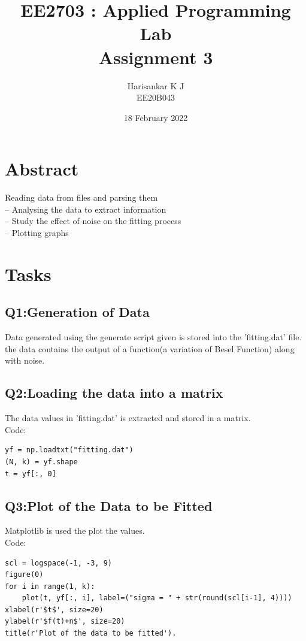 \documentclass[12pt, a4paper]{report}
\title{\textbf{EE2703 : Applied Programming Lab}\\Assignment 3} %
\author{Harisankar K J \\ EE20B043} %
\date{18 February 2022} %
\begin{document}
		
		
\maketitle %
\section*{Abstract}
Reading data from files and parsing them\\
– Analysing the data to extract information\\
– Study the effect of noise on the fitting process\\
– Plotting graphs\\
\section*{Tasks}
\subsection{Q1:Generation of Data}
Data generated using the generate script given is stored into the 'fitting.dat' file. the data contains the output of a function(a variation of Besel Function) along with noise.
\subsection{Q2:Loading the data into a matrix}
The data values in 'fitting.dat' is extracted and stored in a matrix.\\Code:
\begin{verbatim}
yf = np.loadtxt("fitting.dat")
(N, k) = yf.shape
t = yf[:, 0]
\end{verbatim}

\subsection{Q3:Plot of the Data to be Fitted}
Matplotlib is used the plot the values.\\Code:
\begin{verbatim}
scl = logspace(-1, -3, 9)
figure(0)
for i in range(1, k):
    plot(t, yf[:, i], label=("sigma = " + str(round(scl[i-1], 4))))
xlabel(r'$t$', size=20)
ylabel(r'$f(t)+n$', size=20)
title(r'Plot of the data to be fitted').
\end{verbatim}
\end{document}
